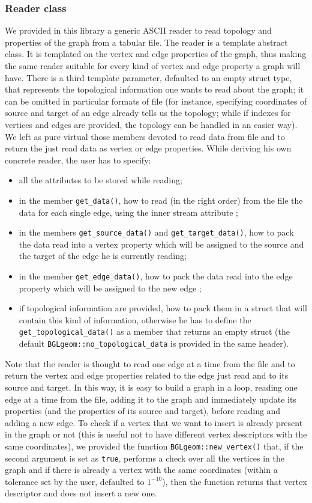 \documentclass[10pt]{article} %
\begin{document}
	\subsubsection{Reader class}		
	We provided in this library a generic ASCII reader to read topology and properties of the graph from a tabular file. The reader is a template abstract class. It is templated on the vertex and edge properties of the graph, thus making the same reader suitable for every kind of vertex and edge property a graph will have. There is a third template parameter, defaulted to an empty struct type, that represents the topological information one wants to read about the graph; it can be omitted in particular formats of file (for instance, specifying coordinates of source and target of an edge already tells us the topology; while if indexes for vertices and edges are provided, the topology can be handled in an easier way). \newline
	We left as pure virtual those members devoted to read data from file and to return the just read data as vertex or edge properties. While deriving his own concrete reader, the user has to specify:
	\begin{itemize}
		\item all the attributes to be stored while reading;
		\item in the member \texttt{get\_data()}, how to read (in the right order) from the file the data for each single edge, using the inner stream attribute ;
		\item in the members \texttt{get\_source\_data()} and \texttt{get\_target\_data()}, how to pack the data read into a vertex property which will be assigned to the source and the target of the edge he is currently reading;
		\item in the member \texttt{get\_edge\_data()}, how to pack the data read into the edge property which will be assigned to the new edge ;
		\item if topological information are provided, how to pack them in a struct that will contain this kind of information, otherwise he has to define the \texttt{get\_topological\_data()} as a member that returns an empty struct (the default \texttt{BGLgeom::no\_topological\_data} is provided in the same header).
	\end{itemize}
	Note that the reader is thought to read one edge at a time from the file and to return the vertex and edge properties related to the edge just read and to its source and target. In this way, it is easy to build a graph in a loop, reading one edge at a time from the file, adding it to the graph and immediately update its properties (and the properties of its source and target), before reading and adding a new edge. To check if a vertex that we want to insert is already present in the graph or not (this is useful not to have different vertex descriptors with the same coordinates), we provided the function \texttt{BGLgeom::new\_vertex()} that, if the second argument is set as \texttt{true}, performs a check over all the vertices in the graph and if there is already a vertex with the same coordinates (within a tolerance set by the user, defaulted to $1^{-10}$), then the function returns that vertex descriptor and does not insert a new one. \newline
\end{document}

